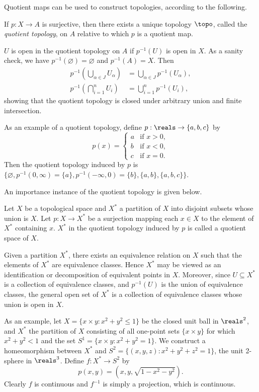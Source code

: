 Quotient maps can be used to construct topologies, according to the following.
\begin{definition}\label{2.74}
    If $p: X \rightarrow A$ is surjective, then there exists a unique topology $\topo$, called the {\it quotient topology}, on $A$ relative to which $p$ is a quotient map.
\end{definition}
$U$ is open in the quotient topology on $A$ if $p^{-1}(U)$ is open in $X$. As a sanity check, we have $p^{-1}(\varnothing) = \varnothing$ and $p^{-1}(A) = X$. Then
\begin{align*}
    p^{-1} \left( \bigcup_{\alpha \in J}U_\alpha \right) &= \bigcup_{\alpha \in J} p^{-1}(U_\alpha), \\
    p^{-1} \left( \bigcap_{i=1}^n U_i \right) &= \bigcup_{i=1}^n p^{-1}(U_i),
\end{align*}
showing that the quotient topology is closed under arbitrary union and finite intersection.

As an example of a quotient topology, define $p: \reals \rightarrow\{a, b, c\}$ by
$$p(x) = \begin{cases}
    a &\text{if } x > 0, \\
    b &\text{if } x < 0, \\
    c &\text{if } x = 0.
\end{cases}$$
Then the quotient topology induced by $p$ is $\{\varnothing, p^{-1}(0, \infty) = \{a\}, p^{-1}(-\infty, 0) = \{b\}, \{a, b\}, \{a, b, c\}\}$.

An importance instance of the quotient topology is given below.
\begin{definition}\label{2.75}
    Let $X$ be a topological space and $X^*$ a partition of $X$ into disjoint subsets whose union is $X$. Let $p: X \rightarrow X^*$ be a surjection mapping each $x \in X$ to the element of $X^*$ containing $x$. $X^*$ in the quotient topology induced by $p$ is called a quotient space of $X$.
\end{definition}
Given a partition $X^*$, there exists an equivalence relation on $X$ such that the elements of $X^*$ are equivalence classes. Hence $X^*$ may be viewed as an identification or decomposition of equivalent points in $X$. Moreover, since $U \subseteq X^*$ is a collection of equivalence classes, and $p^{-1}(U)$ is the union of equivalence classes, the general open set of $X^*$ is a collection of equivalence classes whose union is open in $X$.

As an example, let $X = \{x \times y: x^2+y^2\leq 1\}$ be the closed unit ball in $\reals^2$, and $X^*$ the partition of $X$ consisting of all one-point sets $\{x \times y\}$ for which $x^2+y^2< 1$ and the set $S^1 = \{x\times y: x^2+y^2 = 1\}$. We construct a homeomorphism between $X^*$ and $S^2 = \{(x, y, z): x^2+y^2+z^2 = 1\}$, the unit 2-sphere in $\reals^3$. Define $f: X^* \rightarrow S^2$ by
$$p(x, y) = (x, y, \sqrt{1 - x^2 - y^2}).$$
Clearly $f$ is continuous and $f^{-1}$ is simply a projection, which is continuous.

